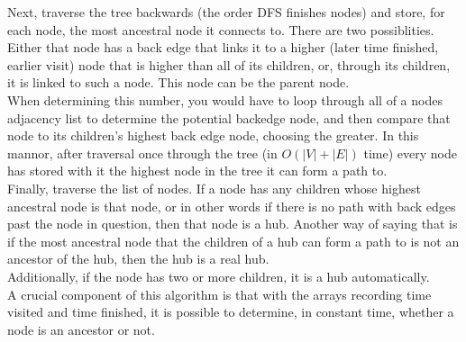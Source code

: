 \documentclass[12pt,twoside]{article}
\begin{document}
\begin{problems}
\begin{problemparts}
Next, traverse the tree backwards (the order DFS finishes nodes) and store, for each node, the most ancestral node it connects to.  There are two possiblities. Either that node has a back edge that links it to a higher (later time finished, earlier visit) node that is higher than all of its children, or, through its children, it is linked to such a node.  This node can be the parent node.\\

When determining this number, you would have to loop through all of a nodes adjacency list to determine the potential backedge node, and then compare that node to its children's highest back edge node, choosing the greater.  In this mannor, after traversal once through the tree (in $O(|V|+|E|)$ time) every node has stored with it the highest node in the tree it can form a path to. \\

Finally, traverse the list of nodes.  If a node has any children whose highest ancestral node is that node, or in other words if there is no path with back edges past the node in question, then that node is a hub.  Another way of saying that is if the most ancestral node that the children of a hub can form a path to is not an ancestor of the hub, then the hub is a real hub.  \\

Additionally, if the node has two or more children, it is a hub automatically.\\

A crucial component of this algorithm is that with the arrays recording time visited and time finished, it is possible to determine, in constant time, whether a node is an ancestor or not.
\end{problemparts}
\end{problems}
\end{document}
